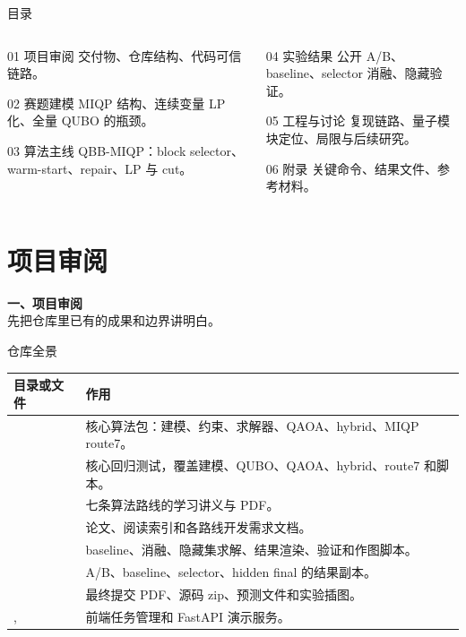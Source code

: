 \documentclass[aspectratio=169]{beamer}
\newcommand{\sectionframe}[2]{
\begin{frame}[plain]
  \vfill
  \begin{center}
    {\Large\bfseries #1}\\[2mm]
    {\small #2}
  \end{center}
  \vfill
\end{frame}
}
\begin{document}
\begin{frame}{目录}
\small
\begin{columns}[T,onlytextwidth]
\begin{column}{0.48\textwidth}
\begin{block}{01 项目审阅}
交付物、仓库结构、代码可信链路。
\end{block}
\begin{block}{02 赛题建模}
MIQP 结构、连续变量 LP 化、全量 QUBO 的瓶颈。
\end{block}
\begin{block}{03 算法主线}
QBB-MIQP：block selector、warm-start、repair、LP 与 cut。
\end{block}
\end{column}
\begin{column}{0.48\textwidth}
\begin{block}{04 实验结果}
公开 A/B、baseline、selector 消融、隐藏验证。
\end{block}
\begin{block}{05 工程与讨论}
复现链路、量子模块定位、局限与后续研究。
\end{block}
\begin{block}{06 附录}
关键命令、结果文件、参考材料。
\end{block}
\end{column}
\end{columns}
\end{frame}

\section{项目审阅}
\sectionframe{一、项目审阅}{先把仓库里已有的成果和边界讲明白。}

\begin{frame}{仓库全景}
\scriptsize
\begin{tabularx}{\linewidth}{p{3.0cm}Y}
\toprule
目录或文件 & 作用 \\
\midrule
{} & 核心算法包：建模、约束、求解器、QAOA、hybrid、MIQP route7。\\
 & 核心回归测试，覆盖建模、QUBO、QAOA、hybrid、route7 和脚本。\\
 & 七条算法路线的学习讲义与 PDF。\\
 & 论文、阅读索引和各路线开发需求文档。\\
 & baseline、消融、隐藏集求解、结果渲染、验证和作图脚本。\\
 & A/B、baseline、selector、hidden final 的结果副本。\\
 & 最终提交 PDF、源码 zip、预测文件和实验插图。\\
,  & 前端任务管理和 FastAPI 演示服务。\\
\bottomrule
\end{tabularx}
\end{frame}
\end{document}
